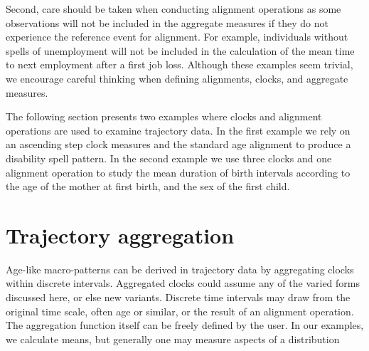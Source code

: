 \documentclass{article}
\begin{document}
Second, care should be taken when conducting alignment operations as some observations will not be included in the aggregate measures if they do not experience the reference event for alignment. For example, individuals without spells of unemployment will not be included in the calculation of the mean time to next employment after a first job loss. Although these examples seem trivial, we encourage careful thinking when defining alignments, clocks, and aggregate measures.

The following section presents two examples where clocks and alignment operations are used to examine trajectory data. In the first example we rely on an ascending step clock measures and the standard age alignment to produce a disability spell pattern. In the second example we use three clocks and one alignment operation to study the mean duration of birth intervals according to the age of the mother at first birth, and the sex of the first child.


\FloatBarrier
\section{Trajectory aggregation}
Age-like macro-patterns can be derived in trajectory data by aggregating clocks within discrete intervals. Aggregated clocks could assume any of the varied forms discussed here, or else new variants. Discrete time intervals may draw from the original time scale, often age or similar, or the result of an alignment operation. The aggregation function itself can be freely defined by the user. In our examples, we calculate means, but generally one may measure aspects of a distribution
\end{document}
